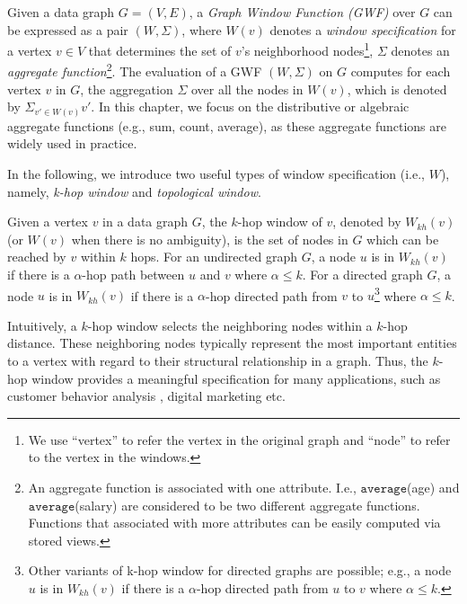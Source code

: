 Given a data graph $G = (V,E)$,
a \emph{Graph Window Function (GWF)} over $G$ can be expressed 
as a pair $(W, \Sigma)$, where 
$W(v)$ denotes a \emph{window specification} for a vertex $v \in V$ 
that determines the set of $v$'s neighborhood nodes\footnote{We use ``vertex'' to refer the vertex in the original graph and ``node'' to refer to the vertex in the windows.},
$\Sigma$ denotes an \emph{aggregate function}\footnote{An aggregate function is associated with one attribute. I.e., $\mathtt{average}$(age) and $\mathtt{average}$(salary) are considered to be two different aggregate functions. Functions that associated with more attributes can be easily computed via stored views.}.
The evaluation of a GWF $(W, \Sigma)$ on $G$
computes for each vertex $v$ in $G$, the aggregation $\Sigma$ 
over all the nodes in $W(v)$, which is denoted by $\Sigma_{v' \in W(v)} v'$.
%
In this chapter, we focus on the distributive or algebraic aggregate functions (e.g., sum, count, average), as these aggregate functions are widely used in practice. 
 
In the following, we introduce two useful types of window specification (i.e., $W$), namely, 
\emph{k-hop window} and \emph{topological window}.


\begin{definition} 
Given a vertex $v$ in a data graph $G$, 
the $k$-hop window of $v$, denoted by $W_{kh}(v)$ (or $W(v)$ when there is no ambiguity),
is the set of nodes in $G$ which can be reached by $v$ within $k$ hops.
For an undirected graph $G$,
a node $u$ is in $W_{kh}(v)$  if there is a $\alpha$-hop path between $u$ and $v$ where $\alpha \leqslant k$.
For a directed graph $G$,
a node $u$ is in $W_{kh}(v)$  if there is a $\alpha$-hop directed path from $v$ to $u$\footnote{
Other variants of k-hop window for directed graphs are possible; e.g.,
a node $u$ is in $W_{kh}(v)$  if there is a $\alpha$-hop directed path from $u$ to $v$ where $\alpha \leqslant k$.
} where $\alpha \leqslant k$.
\end{definition}

Intuitively, a $k$-hop window selects the neighboring nodes within a $k$-hop distance. 
These neighboring nodes typically represent the most important 
entities to a vertex with regard to their structural relationship in a graph. 
Thus, the $k$-hop window provides a meaningful specification for many applications, such as customer behavior analysis \cite{briscoe2013determining,dai2012predicting} , digital marketing \cite{ma2010ego} etc.

